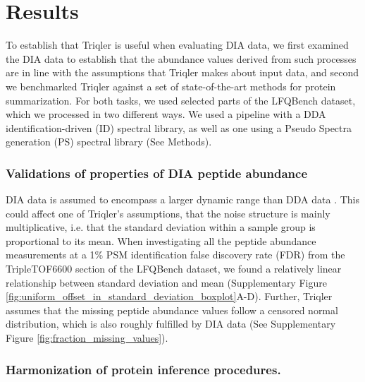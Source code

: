 \documentclass[10pt,letterpaper]{article}
\begin{document}
\section*{Results}

To establish that Triqler is useful when evaluating DIA data, we first examined the DIA data to establish that the abundance values derived from such processes are in line with the assumptions that Triqler makes about input data, and second we benchmarked Triqler against a set of state-of-the-art methods for protein summarization. For both tasks, we used selected parts of the LFQBench dataset, which we processed in two different ways. We used a pipeline with a DDA identification-driven (ID) spectral library, as well as one using a Pseudo Spectra generation (PS) spectral library (See Methods).


\subsubsection*{Validations of properties of DIA peptide abundance}

DIA data is assumed to encompass a larger dynamic range than DDA data . This could affect one of Triqler's assumptions, that the noise structure is mainly multiplicative, i.e. that the standard deviation within a sample group is proportional to its mean. When investigating all the peptide abundance measurements at a 1\% PSM identification false discovery rate (FDR) from the TripleTOF6600 section of the LFQBench dataset, we found a relatively linear relationship between standard deviation and mean (Supplementary Figure \ref{fig:uniform_offset_in_standard_deviation_boxplot}A-D). Further, Triqler assumes that the missing peptide abundance values follow a censored normal distribution, which is also roughly fulfilled by DIA data (See Supplementary Figure \ref{fig:fraction_missing_values}).


\subsubsection*{Harmonization of protein inference procedures.}
\end{document}

